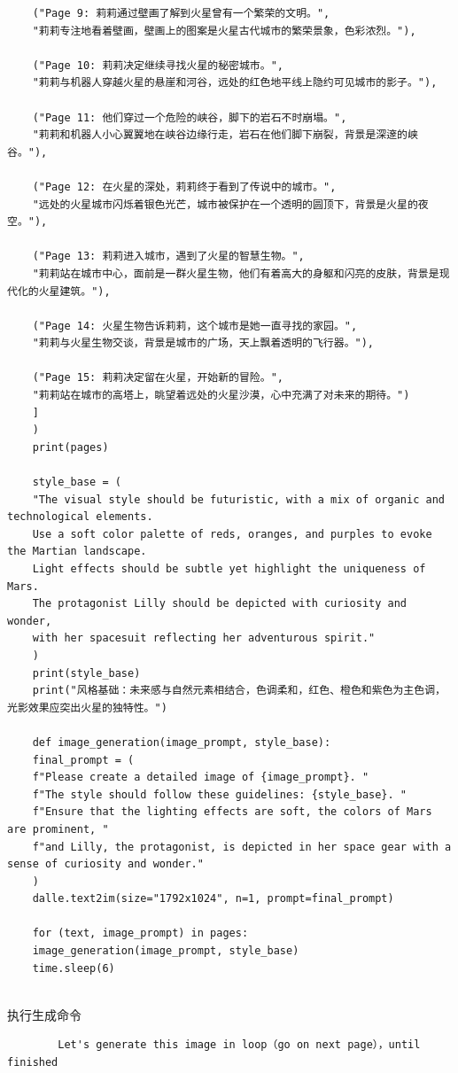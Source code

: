 \documentclass[12pt]{book}
\begin{document}
\begin{lstlisting}
	("Page 9: 莉莉通过壁画了解到火星曾有一个繁荣的文明。",
	"莉莉专注地看着壁画，壁画上的图案是火星古代城市的繁荣景象，色彩浓烈。"),
	
	("Page 10: 莉莉决定继续寻找火星的秘密城市。",
	"莉莉与机器人穿越火星的悬崖和河谷，远处的红色地平线上隐约可见城市的影子。"),
	
	("Page 11: 他们穿过一个危险的峡谷，脚下的岩石不时崩塌。",
	"莉莉和机器人小心翼翼地在峡谷边缘行走，岩石在他们脚下崩裂，背景是深邃的峡谷。"),
	
	("Page 12: 在火星的深处，莉莉终于看到了传说中的城市。",
	"远处的火星城市闪烁着银色光芒，城市被保护在一个透明的圆顶下，背景是火星的夜空。"),
	
	("Page 13: 莉莉进入城市，遇到了火星的智慧生物。",
	"莉莉站在城市中心，面前是一群火星生物，他们有着高大的身躯和闪亮的皮肤，背景是现代化的火星建筑。"),
	
	("Page 14: 火星生物告诉莉莉，这个城市是她一直寻找的家园。",
	"莉莉与火星生物交谈，背景是城市的广场，天上飘着透明的飞行器。"),
	
	("Page 15: 莉莉决定留在火星，开始新的冒险。",
	"莉莉站在城市的高塔上，眺望着远处的火星沙漠，心中充满了对未来的期待。")
	]
	)
	print(pages)
	
	style_base = (
	"The visual style should be futuristic, with a mix of organic and technological elements. 
	Use a soft color palette of reds, oranges, and purples to evoke the Martian landscape. 
	Light effects should be subtle yet highlight the uniqueness of Mars. 
	The protagonist Lilly should be depicted with curiosity and wonder, 
	with her spacesuit reflecting her adventurous spirit."
	)
	print(style_base)
	print("风格基础：未来感与自然元素相结合，色调柔和，红色、橙色和紫色为主色调，光影效果应突出火星的独特性。")
	
	def image_generation(image_prompt, style_base):
	final_prompt = (
	f"Please create a detailed image of {image_prompt}. "
	f"The style should follow these guidelines: {style_base}. "
	f"Ensure that the lighting effects are soft, the colors of Mars are prominent, "
	f"and Lilly, the protagonist, is depicted in her space gear with a sense of curiosity and wonder."
	)
	dalle.text2im(size="1792x1024", n=1, prompt=final_prompt)
	
	for (text, image_prompt) in pages:
	image_generation(image_prompt, style_base)
	time.sleep(6)
		

	\end{lstlisting}
	
	执行生成命令

	\begin{lstlisting}
		Let's generate this image in loop（go on next page），until finished
\end{lstlisting}
\end{document}
